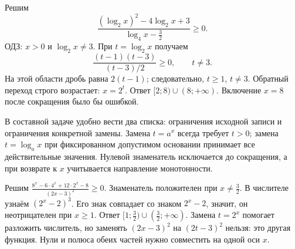 \begin{example}\label{ex:review-ege-exam-exponential-2}
Решим
\[
\frac{(\log_2x)^2-4\log_2x+3}{\log_4x-\frac32}\ge0.
\]
ОДЗ: \(x>0\) и \(\log_2x\ne3\). При \(t=\log_2x\) получаем
\[
\frac{(t-1)(t-3)}{(t-3)/2}\ge0,
\qquad t\ne3.
\]
На этой области дробь равна \(2(t-1)\); следовательно, \(t\ge1\), \(t\ne3\). Обратный переход строго возрастает: \(x=2^t\). Ответ \([2;8)\cup(8;+\infty)\). Включение \(x=8\) после сокращения было бы ошибкой.
\end{example}
В составной задаче удобно вести два списка: ограничения исходной записи и ограничения конкретной замены. Замена \(t=a^x\) всегда требует \(t>0\); замена \(t=\log_a x\) при фиксированном допустимом основании принимает все действительные значения. Нулевой знаменатель исключается до сокращения, а при возврате к \(x\) учитывается направление монотонности.

\begin{example}\label{ex:review-ege-exam-exponential-3}
Решим \(\frac{8^x-6\cdot4^x+12\cdot2^x-8}{(2x-3)^2}\ge0\). Знаменатель положителен при \(x\ne\frac32\). В числителе узнаём \((2^x-2)^3\). Его знак совпадает со знаком \(2^x-2\), значит, он неотрицателен при \(x\ge1\). Ответ \([1;\frac32)\cup(\frac32;+\infty)\). Замена \(t=2^x\) помогает разложить числитель, но заменять \((2x-3)^2\) на \((2t-3)^2\) нельзя: это другая функция. Нули и полюса обеих частей нужно совместить на одной оси \(x\).
\end{example}

